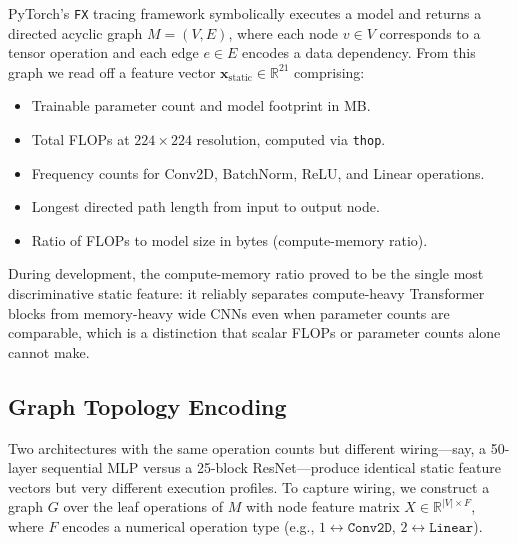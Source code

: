 \documentclass[conference]{IEEEtran}
\begin{document}
PyTorch's \texttt{FX} tracing framework symbolically executes a model and
returns a directed acyclic graph $M = (V, E)$, where each node $v \in V$
corresponds to a tensor operation and each edge $e \in E$ encodes a data
dependency. From this graph we read off a feature vector
$\mathbf{x}_{\text{static}} \in \mathbb{R}^{21}$ comprising:
\begin{itemize}
    \item Trainable parameter count and model footprint in MB.
    \item Total FLOPs at $224 \times 224$ resolution, computed via \texttt{thop}.
    \item Frequency counts for Conv2D, BatchNorm, ReLU, and Linear operations.
    \item Longest directed path length from input to output node.
    \item Ratio of FLOPs to model size in bytes (compute-memory ratio).
\end{itemize}
During development, the compute-memory ratio proved to be the single most
discriminative static feature: it reliably separates compute-heavy Transformer
blocks from memory-heavy wide CNNs even when parameter counts are comparable,
which is a distinction that scalar FLOPs or parameter counts alone cannot make.

\subsection{Graph Topology Encoding}

Two architectures with the same operation counts but different wiring---say, a
50-layer sequential MLP versus a 25-block ResNet---produce identical static
feature vectors but very different execution profiles. To capture wiring, we
construct a graph $G$ over the leaf operations of $M$ with node feature matrix
$X \in \mathbb{R}^{|V| \times F}$, where $F$ encodes a numerical operation
type (e.g., $1 \leftrightarrow \texttt{Conv2D}$, $2 \leftrightarrow
\texttt{Linear}$).
\end{document}

